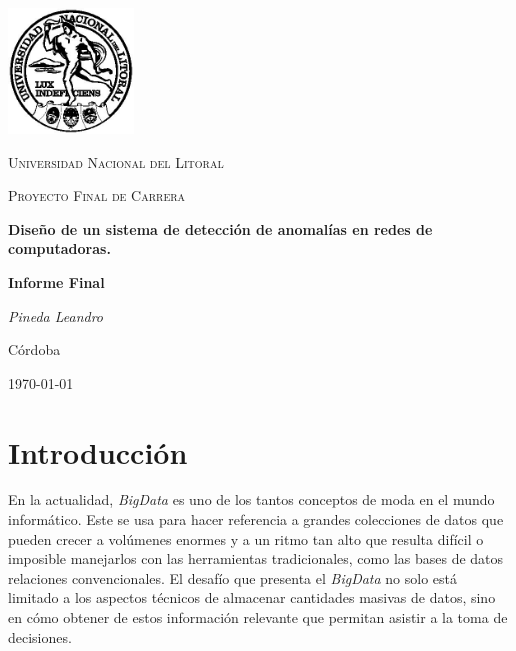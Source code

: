 \documentclass[a4paper,12pt, oneside]{article}
\begin{document}
	
\begin{titlepage}
	\centering
	\includegraphics[width=0.25\textwidth]{../Universidad_del_Litoral}\par\vspace{1cm}
	{\scshape\LARGE Universidad Nacional del Litoral \par}
	\vspace{1cm}
	{\scshape\Large Proyecto Final de Carrera\par}
	\vspace{1.5cm}
	{\huge\bfseries Diseño de un sistema de detección de anomalías en redes de computadoras.\par}
	\vspace{4cm}
	{\huge\bfseries Informe Final\par}
	\vfill
	
	{\Large \itshape Pineda Leandro\par}
	
	
	\large Córdoba\par
	{\large \today\par}	
\end{titlepage}


\clearpage\mbox{}\clearpage
\tableofcontents

\newpage

\section{Introducción}
En la actualidad, \textit{BigData} es uno de los tantos conceptos de moda en el mundo informático. Este se usa para hacer referencia a grandes colecciones de datos que pueden crecer a volúmenes enormes y a un ritmo tan alto que resulta difícil o imposible manejarlos con las herramientas tradicionales, como las bases de datos relaciones convencionales. El desafío que presenta el \textit{BigData} no solo está limitado a los aspectos técnicos de almacenar cantidades masivas de datos, sino en cómo obtener de estos información relevante que permitan asistir a la toma de decisiones.

\
\end{document}
